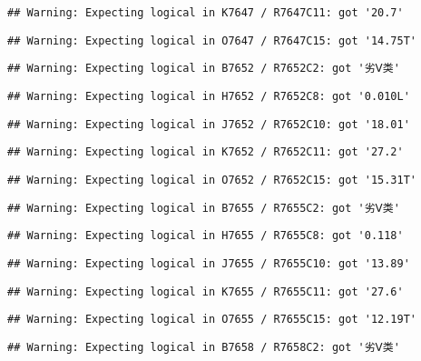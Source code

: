 \documentclass[
]{article}
\begin{document}
\begin{verbatim}
## Warning: Expecting logical in K7647 / R7647C11: got '20.7'
\end{verbatim}

\begin{verbatim}
## Warning: Expecting logical in O7647 / R7647C15: got '14.75T'
\end{verbatim}

\begin{verbatim}
## Warning: Expecting logical in B7652 / R7652C2: got '劣Ⅴ类'
\end{verbatim}

\begin{verbatim}
## Warning: Expecting logical in H7652 / R7652C8: got '0.010L'
\end{verbatim}

\begin{verbatim}
## Warning: Expecting logical in J7652 / R7652C10: got '18.01'
\end{verbatim}

\begin{verbatim}
## Warning: Expecting logical in K7652 / R7652C11: got '27.2'
\end{verbatim}

\begin{verbatim}
## Warning: Expecting logical in O7652 / R7652C15: got '15.31T'
\end{verbatim}

\begin{verbatim}
## Warning: Expecting logical in B7655 / R7655C2: got '劣Ⅴ类'
\end{verbatim}

\begin{verbatim}
## Warning: Expecting logical in H7655 / R7655C8: got '0.118'
\end{verbatim}

\begin{verbatim}
## Warning: Expecting logical in J7655 / R7655C10: got '13.89'
\end{verbatim}

\begin{verbatim}
## Warning: Expecting logical in K7655 / R7655C11: got '27.6'
\end{verbatim}

\begin{verbatim}
## Warning: Expecting logical in O7655 / R7655C15: got '12.19T'
\end{verbatim}

\begin{verbatim}
## Warning: Expecting logical in B7658 / R7658C2: got '劣Ⅴ类'
\end{verbatim}
\end{document}
